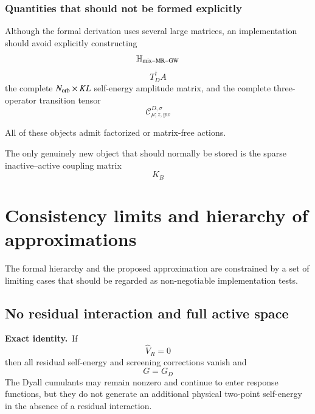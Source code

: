 \documentclass[aip,jcp,reprint,noshowkeys,superscriptaddress]{revtex4-1}
\newcommand{\Exact}{\textbf{Exact identity.}\ }
\begin{document}
\subsubsection{Quantities that should not be formed explicitly}

Although the formal derivation uses several large matrices, an
implementation should avoid explicitly constructing
\begin{equation}
  \mathbb H_{\rm mix-MR-GW}
\end{equation}
\begin{equation}
  T_D^\dagger A
\end{equation}
the complete $N_{\rm orb}\times KL$ self-energy amplitude matrix, and
the complete three-operator transition tensor
\begin{equation}
  \mathcal C_{\mu;z,yw}^{D,\sigma}
\end{equation}

All of these objects admit factorized or matrix-free actions.

The only genuinely new object that should normally be stored is the
sparse inactive--active coupling matrix
\begin{equation}
  K_B
\end{equation}
\section{Consistency limits and hierarchy of approximations}
\label{sec:consistency}

The formal hierarchy and the proposed approximation are constrained by a set
of limiting cases that should be regarded as non-negotiable implementation
tests.
\subsection{No residual interaction and full active space}

\Exact If
\begin{equation}
  \hat V_R=0
\end{equation}
then all residual self-energy and screening corrections vanish and
\begin{equation}
  G=G_D
\end{equation}
The Dyall cumulants may remain nonzero and continue to enter response
functions, but they do not generate an additional physical two-point
self-energy in the absence of a residual interaction.
\end{document}
